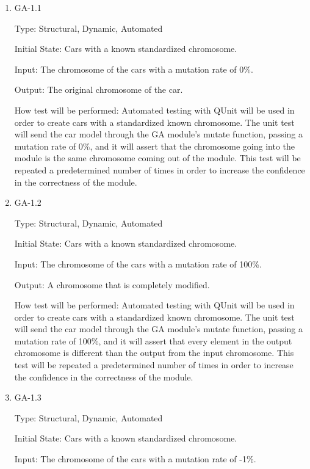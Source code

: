 \documentclass[12pt, titlepage]{article}
\begin{document}
\begin{enumerate}

\item{GA-1.1\\}

Type: Structural, Dynamic, Automated
					
Initial State: Cars with a known standardized chromosome. 
					
Input: The chromosome of the cars with a mutation rate of 0\%.
					
Output: The original chromosome of the car.
					
How test will be performed: Automated testing with QUnit will be used in order 
to create cars with a standardized known chromosome. The unit test will send the 
car model through the GA module's mutate function, passing a mutation rate of 
0\%, and it will assert that the chromosome going into the module is the same 
chromosome coming out of the module. This test will be repeated  a predetermined 
number of times in order to increase the confidence in the correctness of the 
module.
					
\item{GA-1.2\\}

Type: Structural, Dynamic, Automated
					
Initial State: Cars with a known standardized chromosome. 
					
Input: The chromosome of the cars with a mutation rate of 100\%.
					
Output: A chromosome that is completely modified.
					
How test will be performed: Automated testing with QUnit will be used in order 
to create cars with a standardized known chromosome. The unit test will send the 
car model through the GA module's mutate function, passing a mutation rate of 
100\%, and it will assert that every element in the output chromosome is 
different than the output from the input chromosome. This test will be repeated  
a predetermined number of times in order to increase the confidence in the 
correctness of the module.

\item{GA-1.3\\}

Type: Structural, Dynamic, Automated
					
Initial State: Cars with a known standardized chromosome. 
					
Input: The chromosome of the cars with a mutation rate of -1\%.
					

\end{enumerate}
\end{document}
